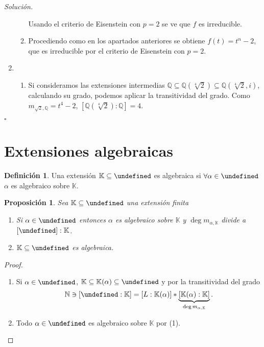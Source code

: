\documentclass[10pt, spanish]{report}
\newtheorem*{prop}{Proposición}
\theoremstyle{definition}
\newtheorem*{defin}{Definición}
\newenvironment{sol}{\textit{Solución.}}{\hfill$\square$}
\newcommand{\N}{\mathbb{N}}
\newcommand{\Q}{\mathbb{Q}}
\newcommand{\K}{\mathbb{K}}
\let\L\undefined
\newcommand{\L}{\mathbb{L}}
\newcommand{\fecha}[1]{\marginpar{\underline{#1}}}
\begin{document}
\begin{sol}
\begin{enumerate}
\begin{enumerate}
                     Usando el criterio de Eisenstein con $p=2$ se ve que $f$ es
                     irreducible.
                \item Procediendo como en los apartados anteriores se obtiene
                    $f(t)=t^n-2$, que es irreducible por el criterio de
                    Eisenstein con $p=2$.
            \end{enumerate}
        \item
            \begin{enumerate}
                \item Si consideramos las extensiones intermedias
                    $\Q\subseteq\Q(\sqrt[4]{2})\subseteq\Q(\sqrt[4]{2},i)$,
                    calculando su grado, podemos aplicar la transitividad del
                    grado. Como $m_{\sqrt{2},\Q}=t^4-2$,
                    $[\Q(\sqrt[4]{2}):\Q]=4$.
            \end{enumerate}
    \end{enumerate}
\end{sol}
\fecha{1/03}
\section{Extensiones algebraicas}
\begin{defin}
    Una extensión $\K\subseteq\L$ es algebraica si $\forall\alpha\in\L$ $\alpha$
    es algebraico sobre $\K$.
\end{defin}

\begin{prop}
    Sea $\K\subseteq\L$ una extensión finita
    \begin{enumerate}
        \item Si $\alpha\in \L$ entonces $\alpha$ es algebraico sobre $\K$ y
            $\deg{m_{\alpha,\K}}$ divide a $[\L]:\K$.
        \item $\K\subseteq\L$ es algebraica.
    \end{enumerate}
\end{prop}

\begin{proof}\hspace{0pt}
    \begin{enumerate}
        \item Si $\alpha\in\L$,  $\K\subseteq\K(\alpha)\subseteq\L$  y por la
            transitividad del grado
            \[\N\ni[\L:\K]=[L:\K(\alpha)]*\underbrace{[\K(\alpha):\K]}_{\deg{m_{\alpha,\K}}}.\]
        \item Todo $\alpha\in\L$ es algebraico sobre $\K$ por (1).
    \end{enumerate}
\end{proof}
\end{document}
